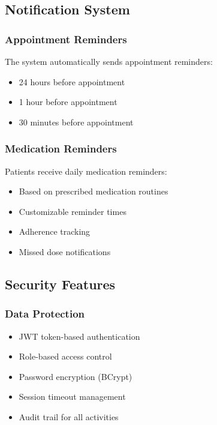 \documentclass[12pt,a4paper]{article}
\begin{document}
\subsection{Notification System}

\subsubsection{Appointment Reminders}

The system automatically sends appointment reminders:
\begin{itemize}
    \item 24 hours before appointment
    \item 1 hour before appointment
    \item 30 minutes before appointment
\end{itemize}

\subsubsection{Medication Reminders}

Patients receive daily medication reminders:
\begin{itemize}
    \item Based on prescribed medication routines
    \item Customizable reminder times
    \item Adherence tracking
    \item Missed dose notifications
\end{itemize}

\subsection{Security Features}

\subsubsection{Data Protection}

\begin{itemize}
    \item JWT token-based authentication
    \item Role-based access control
    \item Password encryption (BCrypt)
    \item Session timeout management
    \item Audit trail for all activities
\end{itemize}
\end{document}

